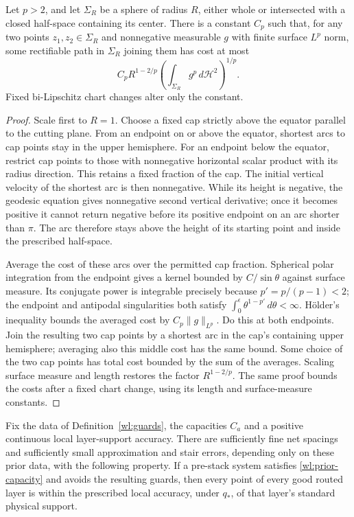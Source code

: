 \begin{lemma}\label{wl:sphere}
Let $p>2$, and let $\Sigma_R$ be a sphere of radius $R$, either whole
or intersected with a closed half-space containing its center.  There
is a constant $C_p$ such that, for any two points $z_1,z_2\in\Sigma_R$
and nonnegative measurable $g$ with finite surface $L^p$ norm, some
rectifiable path in $\Sigma_R$ joining them has cost at most
\begin{equation}\label{wl:sphere-upper}
 C_p R^{1-2/p}\left(\int_{\Sigma_R}g^p\,d\mathcal H^2\right)^{1/p}.
\end{equation}
Fixed bi-Lipschitz chart changes alter only the constant.
\end{lemma}

\begin{proof}
Scale first to $R=1$.  Choose a fixed cap strictly above the equator
parallel to the cutting plane.  From an endpoint on or above the
equator, shortest arcs to cap points stay in the upper hemisphere.
For an endpoint below the equator, restrict cap points to those with
nonnegative horizontal scalar product with its radius direction.
This retains a fixed fraction of the cap.  The initial vertical
velocity of the shortest arc is then nonnegative.  While its height
is negative, the geodesic equation gives nonnegative second
vertical derivative; once it becomes positive it cannot return
negative before its positive endpoint on an arc shorter than $\pi$.
The arc therefore stays above the height of its starting point and
inside the prescribed half-space.

Average the cost of these arcs over the permitted cap fraction.
Spherical polar integration from the endpoint gives a kernel bounded
by $C/\sin\theta$ against surface measure.  Its conjugate power is
integrable precisely because $p'=p/(p-1)<2$; the endpoint and
antipodal singularities both satisfy
$\int_0^\epsilon\theta^{1-p'}\,d\theta<\infty$.
Hölder's inequality bounds the averaged cost by $C_p\|g\|_{L^p}$.
Do this at both endpoints.  Join the resulting two cap points by a
shortest arc in the cap's containing upper hemisphere; averaging
also this middle cost has the same bound.  Some choice of the two
cap points has total cost bounded by the sum of the averages.
Scaling surface measure and length restores the factor
$R^{1-2/p}$.  The same proof bounds the costs after a fixed chart
change, using its length and surface-measure constants.
\end{proof}

\begin{proposition}\label{wl:barrier}
Fix the data of Definition~\ref{wl:guards}, the capacities $C_a$ and
a positive continuous local layer-support accuracy.  There are
sufficiently fine net spacings and sufficiently small approximation
and stair errors, depending only on these prior data, with the
following property.  If a pre-stack system satisfies
\eqref{wl:prior-capacity} and avoids the resulting guards, then every
point of every good routed layer is within the prescribed local
accuracy, under $q_*$, of that layer's standard physical support.
\end{proposition}

